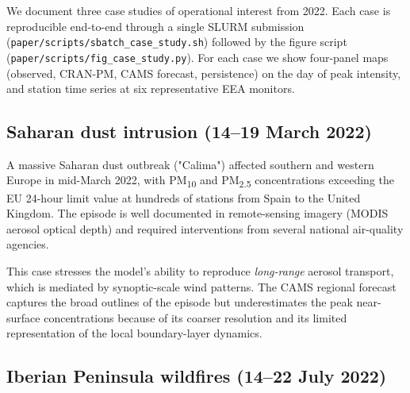 
We document three case studies of operational interest from 2022.
Each case is reproducible end-to-end through a single SLURM
submission (\texttt{paper/scripts/sbatch\_case\_study.sh}) followed
by the figure script (\texttt{paper/scripts/fig\_case\_study.py}).
For each case we show four-panel maps (observed, CRAN-PM, CAMS
forecast, persistence) on the day of peak intensity, and station
time series at six representative EEA monitors.

\subsection{Saharan dust intrusion (14--19 March 2022)}
\label{sec:case:saharan}

A massive Saharan dust outbreak ("Calima") affected southern and
western Europe in mid-March 2022, with PM\textsubscript{10} and
PM\textsubscript{2.5} concentrations exceeding the EU 24-hour
limit value at hundreds of stations from Spain to the United
Kingdom. The episode is well documented in remote-sensing imagery
(MODIS aerosol optical depth) and required interventions from
several national air-quality agencies.

This case stresses the model's ability to reproduce
\emph{long-range} aerosol transport, which is mediated by
synoptic-scale wind patterns. The CAMS regional forecast captures
the broad outlines of the episode but underestimates the peak
near-surface concentrations because of its coarser resolution and
its limited representation of the local boundary-layer dynamics.



\subsection{Iberian Peninsula wildfires (14--22 July 2022)}
\label{sec:case:iberian}

